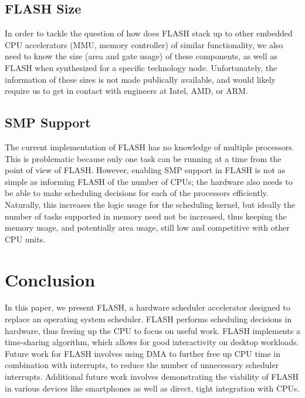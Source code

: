 \documentclass{sig-alternate-10pt}
\begin{document}
\subsection{FLASH Size}
\label{subsec:flash_size}
In order to tackle the question of how does FLASH stack up to other embedded
CPU accelerators (MMU, memory controller) of similar functionality, we also
need to know the size (area and gate usage) of these components, as well as
FLASH when synthesized for a specific technology node. Unfortunately, the
information of these sizes is not made publically available, and would
likely require us to get in contact with engineers at Intel, AMD, or ARM.

\subsection{SMP Support}
The current implementation of FLASH has no knowledge of multiple processors. This is problematic because only one task can be running at a time from the point of view of FLASH. However, enabling SMP support in FLASH is not as simple as informing FLASH of the number of CPUs; the hardware also needs to be able to make scheduling decisions for each of the processors efficiently. Naturally, this increases the logic usage for the scheduling kernel, but ideally the number of tasks supported in memory need not be increased, thus keeping the memory usage, and potentially area usage, still low and competitive with other CPU units.

\section{Conclusion}
\label{sec:conclusion}
In this paper, we present FLASH, a hardware scheduler accelerator designed
to replace an operating system scheduler. FLASH performs scheduling
decisions in hardware, thus freeing up the CPU to focus on useful work.
FLASH implements a time-sharing algorithm, which allows for good
interactivity on desktop workloads. Future work for FLASH involves using DMA
to further free up CPU time in combination with interrupts, to reduce the
number of unnecessary scheduler interrupts. Additional future work involves
demonstrating the viability of FLASH in various devices like smartphones as
well as direct, tight integration with CPUs.

\nocite{*}
{
	
	
}
\end{document}
